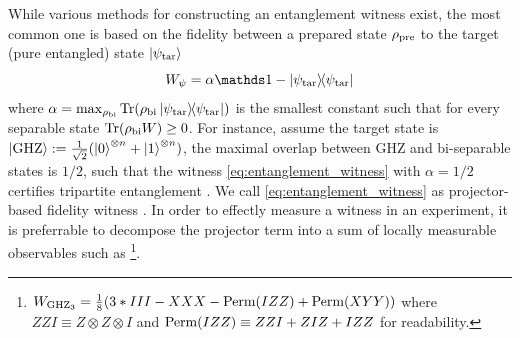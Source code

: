 \documentclass[
aps,
pra,
twocolumn,
floatfix,
]{revtex4-2}
\theoremstyle{plain}
\theoremstyle{definition}
\newtheorem{remark}{Remark}
\newcommand{\ew}{W}
\newcommand{\ob}{O}
\newcommand{\dm}{\rho}
\newcommand{\ghz}{\text{GHZ}}
\newcommand{\bi}{\text{bi}}
\newcommand{\perm}{\textup{Perm}}
\newcommand{\target}{\textup{tar}}
\newcommand{\prepare}{\textup{pre}}
\newcommand{\px}{X}
\newcommand{\pz}{Z}
\begin{document}
While various methods for constructing an entanglement witness exist, the most common one is based on the fidelity between a prepared state $\dm_{\prepare}$ to the target (pure entangled) state $\ket{\psi_{\target}}$
\begin{equation}
	\ew_{\psi} = \alpha\identity - \op{\psi_\target} 
	\label{eq:entanglement_witness}
\end{equation}
where $\alpha = \max_{\dm_{\bi}} \Tr(\dm_{\bi}\op{\psi_{\target}})$ is the smallest constant such that for every separable state $\Tr(\dm_{\bi}\ew)\ge 0$.
For instance, assume the target state is $\ket{\ghz}:=\frac{1}{\sqrt{2}}(\ket{0}^{\otimes n} + \ket{1}^{\otimes n} )$,
the maximal overlap between GHZ and bi-separable states is $1/2$,
such that the witness \cref{eq:entanglement_witness} with $\alpha=1/2$ certifies tripartite entanglement
\cite{acinClassificationMixedThreequbit2001}.
We call \cref{eq:entanglement_witness} as projector-based fidelity witness \cite{bourennaneWitnessingMultipartiteEntanglement2004}.
In order to effectly measure a witness in an experiment, it is preferrable to decompose the projector term into a sum of locally measurable observables such as 
\footnote{
	$\ew_{\ghz_3} = \frac{1}{8} \qty( 3*III - \px\px\px - \perm(I\pz \pz ) + \perm(XYY))$
	where $\pz \pz I\equiv \pz \otimes\pz \otimes I$ and $\perm(I\pz \pz )\equiv \pz \pz I + \pz I\pz + I\pz \pz$ for readability. 
}.
\end{document}
